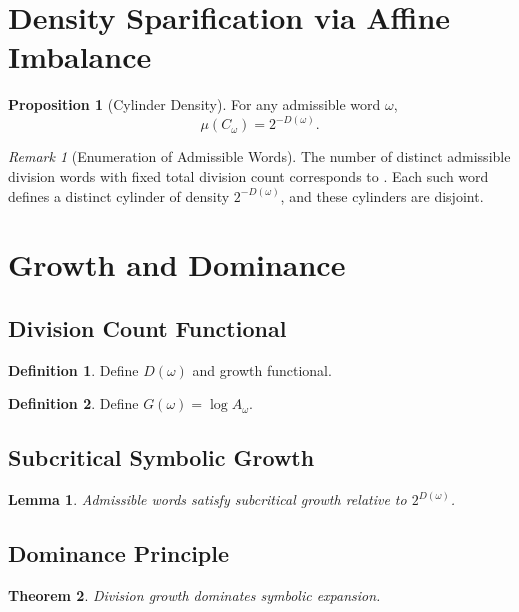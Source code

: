 \documentclass[12pt, oneside]{article}
\numberwithin{equation}{section}
\theoremstyle{definition}
\newtheorem{definition}{Definition}[section]
\newtheorem{proposition}{Proposition}[section]
\theoremstyle{plain}
\newtheorem{theorem}{Theorem}[section]
\newtheorem{lemma}[theorem]{Lemma}
\theoremstyle{remark}
\newtheorem*{remark}{Remark}
\begin{document}
\section{Density Sparification via Affine Imbalance}

\begin{proposition}[Cylinder Density]
For any admissible word $\omega$,
\[
\mu(C_\omega) = 2^{-D(\omega)}.
\]
\end{proposition}

\begin{remark}[Enumeration of Admissible Words]
The number of distinct admissible division words with fixed total division
count corresponds to . Each such word defines a distinct
cylinder of density $2^{-D(\omega)}$, and these cylinders are disjoint.
\end{remark}

\section{Growth and Dominance}

\subsection{Division Count Functional}

\begin{definition}
Define $D(\omega)$ and growth functional.
\end{definition}

\begin{definition}
Define $G(\omega) = \log A_\omega$.
\end{definition}

\subsection{Subcritical Symbolic Growth}

\begin{lemma}
Admissible words satisfy subcritical growth relative to $2^{D(\omega)}$.
\end{lemma}

\subsection{Dominance Principle}

\begin{theorem}
Division growth dominates symbolic expansion.
\end{theorem}
\end{document}
